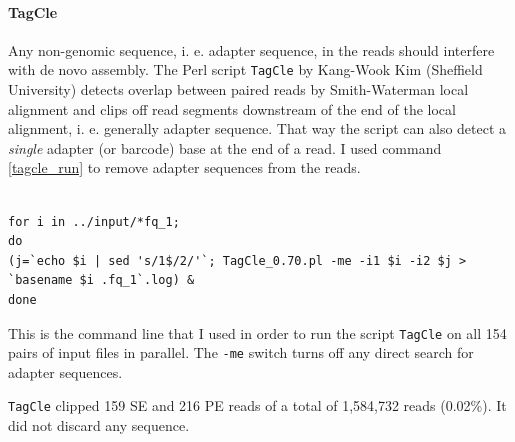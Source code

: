 \documentclass[a4paper,12pt,times,print,index,custombib,custommargin]{PhDThesisPSnPDF}\usepackage[]{graphicx}\usepackage[]{color}
\begin{document}
%
%
%

\paragraph{TagCle}
Any non-genomic sequence, i. e. adapter sequence, in the reads should interfere with de novo assembly. The Perl script \texttt{TagCle} by Kang-Wook Kim (Sheffield University) detects overlap between paired reads by Smith-Waterman local alignment and clips off read segments downstream of the end of the local alignment, i. e. generally adapter sequence. That way the script can also detect a \emph{single} adapter (or barcode) base at the end of a read. I used command \ref{tagcle_run} to remove adapter sequences from the reads.
%
\begin{cmd}
\captionsetup{type=cmd} %
\begin{Verbatim}[fontsize=\scriptsize, formatcom=\color{darkgray}]

for i in ../input/*fq_1; 
do 
(j=`echo $i | sed 's/1$/2/'`; TagCle_0.70.pl -me -i1 $i -i2 $j > `basename $i .fq_1`.log) & 
done
\end{Verbatim}
\caption{\small This is the command line that I used in order to run the script \texttt{TagCle} on all 154 pairs of input files in parallel. The \texttt{-me} switch turns off any direct search for adapter sequences.}
\label{tagcle_run}
\end{cmd}
%
\texttt{TagCle} clipped 159 SE and 216 PE reads of a total of 1,584,732 reads (0.02\%). It did not discard any sequence.

%
%
%
\end{document}
